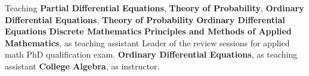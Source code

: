 \begin{rubric}{Teaching}
\entry*[2024 Spring]%
       \textbf{Partial Differential Equations}, 
\entry*[2023 Fall]%
       \textbf{Theory of Probability}, 
\entry*[2023 Spring]%
       \textbf{Ordinary Differential Equations}, 
\entry*[2022 Fall]%
       \textbf{Theory of Probability}
\entry*[2022 Spring]%
       \textbf{Ordinary Differential Equations}
\entry*[2021 Fall]%
        \textbf{Discrete Mathematics}
% 
        \textbf{Principles and Methods of Applied Mathematics}, as teaching assistant
\entry*[2018 Summer] 
        Leader of the review sessions for applied math PhD qualification exam.%
% 
        \textbf{Ordinary Differential Equations}, as teaching assistant
% 
        \textbf{College Algebra}, as instructor.
\end{rubric}
